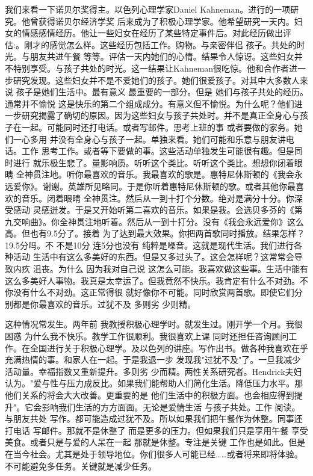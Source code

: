 我们来看一下诺贝尔奖得主。以色列心理学家Daniel Kahneman。进行的一项研究。他曾获得诺贝尔经济学奖 后来成为了积极心理学家。他希望研究一天内。妇女的情感感情经历。他让一些妇女在经历了某些特定事件后。对此经历做出评估:。刚才的感觉怎么样。这些经历包括工作。购物。与亲密伴侣 孩子。共处的时光。与朋友共进午餐 等等。评估一天内她们的心情。结果令人惊讶。这些妇女并不特别享受。与孩子共处的时光。这一结果让Kahneman很吃惊。他和合作者进一步研究发现。这些妇女并不是不爱她们的孩子。她们很爱孩子。对其中大多数人来说 孩子是她们生活中。最有意义 最重要的一部分。但是 她们与孩子共处的经历。通常并不愉悦 这是快乐的第二个组成成分。有意义但不愉悦。为什么呢？他们进一步研究揭露了确切的原因。因为这些妇女与孩子共处时。并不是真正全身心与孩子在一起。可能同时还打电话。或者写邮件。思考上班的事 或者要做的家务。她们一心多用 并没有全身心与孩子一起。单独来看。她们可能和乐意与朋友讲电话。工作 思考工作。或者等下要做的事。这些活动单独发生可能很有趣。但是同时进行 就乐极生悲了。量影响质。听听这个类比。听听这个类比。想想你闭着眼睛 全神贯注地。听你最喜欢的音乐。我最喜欢的歌是。惠特尼休斯顿的《我会永远爱你》。谢谢。英雄所见略同。于是你听着惠特尼休斯顿的歌。或者其他你最喜欢的音乐。闭着眼睛 全神贯注。然后从一到十打个分数。绝对是满分十分。你深受感动 灵感迸发。于是又开始听第二喜欢的音乐。如果是我。会选贝多芬的《第九交响曲》。你全神贯注地听着。然后从一到十打分。没有《我会永远爱你》这么高。但也有9.5分了。接着 为了达到最大效果。你把两首歌同时播放。结果怎样？ 19.5分吗。不 不是10分 连5分也没有 纯粹是噪音。这就是现代生活。我们进行各种活动 生活中有这么多美好的东西。但是又多过头了。这会怎样呢？这常常会导致内疚 沮丧。为什么 因为我对自己说 这怎么可能。我喜欢做这些事。生活中能有这么多美好人事物。我真是太幸运了。但我竟然不快乐。我肯定有什么不对劲。不 你没有什么不对劲。这正常得很 就好像你不可能。同时欣赏两首歌。即使它们分别都是你最喜欢的音乐。过犹不及 多则劣 少则精。 

这种情况常发生。两年前 我教授积极心理学时。就发生过。刚开学一个月。我很困惑 为什么我不快乐。教学工作很顺利。我很喜欢上课 同时还担任咨询顾问工作。在全国进行关于积极心理学。及以色列的讲座。写作出书。做各种我喜欢在乎 充满热情的事。和家人在一起。于是我退一步 发现我"过犹不及"了。一旦我减少活动量。幸福指数又重新提升。多则劣 少而精。两性关系研究者。Hendrick夫妇认为。"爱与性与压力成反比。如果我们能帮助人们简化生活。降低压力水平。那他们关系的将会大大改善。更重要的是 他们生活中的积极方面。也会相应得到提升"。它会影响我们生活的方方面面。无论是爱情生活 与孩子共处。工作 阅读。与朋友共处 写作。都可能造成过犹不及。所以如果我们把午餐作为休整。同事还打电话 写邮件。那就不是休整了 而是更多的压力。但如果我们只是享用午餐 享受美食。或者只是与爱的人呆在一起 那就是休整。专注是关键 工作也是如此。但是在当今社会。尤其是处于领导地位。你们很多人可能已经……或者将来即将体验。不可能避免多任务。关键就是减少任务。 

